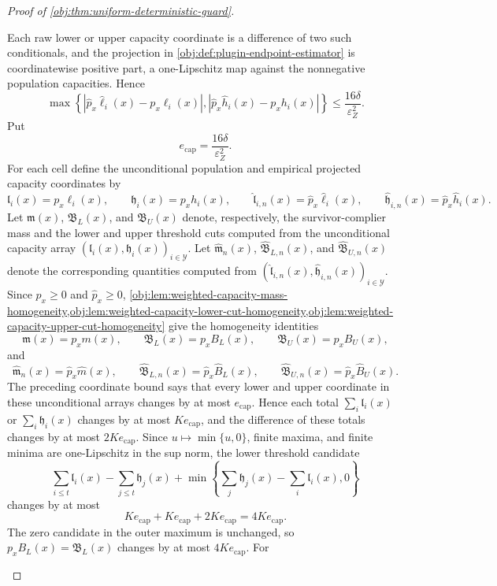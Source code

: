 \documentclass[11pt]{article}
\begin{document}
\begin{proof}[Proof of \cref{obj:thm:uniform-deterministic-guard}]
\begin{enumerate}
Each raw lower or upper capacity coordinate is a difference of two such
conditionals, and the projection in \cref{obj:def:plugin-endpoint-estimator} is
coordinatewise positive part, a one-Lipschitz map against the nonnegative
population capacities.  Hence
\[
\max\left\{
\left|\widehat p_x\widehat\ell_i(x)-p_x\ell_i(x)\right|,
\left|\widehat p_x\widehat h_i(x)-p_xh_i(x)\right|
\right\}
\le
\frac{16\delta}{\varepsilon_Z^2}.
\]
Put
\[
e_{\mathrm{cap}}=\frac{16\delta}{\varepsilon_Z^2}.
\]
For each cell define the unconditional population and empirical projected
capacity coordinates by
\[
\mathfrak l_i(x)=p_x\ell_i(x),
\qquad
\mathfrak h_i(x)=p_xh_i(x),
\qquad
\widehat{\mathfrak l}_{i,n}(x)=\widehat p_x\widehat\ell_i(x),
\qquad
\widehat{\mathfrak h}_{i,n}(x)=\widehat p_x\widehat h_i(x).
\]
Let \(\mathfrak m(x)\), \(\mathfrak B_L(x)\), and \(\mathfrak B_U(x)\) denote,
respectively, the survivor-complier mass and the lower and upper threshold cuts
computed from the unconditional capacity array
\((\mathfrak l_i(x),\mathfrak h_i(x))_{i\in\mathcal Y}\).  Let
\(\widehat{\mathfrak m}_n(x)\), \(\widehat{\mathfrak B}_{L,n}(x)\), and
\(\widehat{\mathfrak B}_{U,n}(x)\) denote the corresponding quantities computed
from
\((\widehat{\mathfrak l}_{i,n}(x),\widehat{\mathfrak h}_{i,n}(x))_{i\in\mathcal Y}\).
Since \(p_x\ge0\) and \(\widehat p_x\ge0\),
\cref{obj:lem:weighted-capacity-mass-homogeneity,obj:lem:weighted-capacity-lower-cut-homogeneity,obj:lem:weighted-capacity-upper-cut-homogeneity}
give the homogeneity identities
\[
\mathfrak m(x)=p_xm(x),
\qquad
\mathfrak B_L(x)=p_xB_L(x),
\qquad
\mathfrak B_U(x)=p_xB_U(x),
\]
and
\[
\widehat{\mathfrak m}_n(x)=\widehat p_x\widehat m(x),
\qquad
\widehat{\mathfrak B}_{L,n}(x)=\widehat p_x\widehat B_L(x),
\qquad
\widehat{\mathfrak B}_{U,n}(x)=\widehat p_x\widehat B_U(x).
\]
The preceding coordinate bound says that every lower and upper coordinate in
these unconditional arrays changes by at most \(e_{\mathrm{cap}}\).  Hence each
total \(\sum_i\mathfrak l_i(x)\) or \(\sum_i\mathfrak h_i(x)\) changes by at most
\(Ke_{\mathrm{cap}}\), and the difference of these totals changes by at most
\(2Ke_{\mathrm{cap}}\).  Since \(u\mapsto \min\{u,0\}\), finite maxima, and
finite minima are one-Lipschitz in the sup norm, the lower threshold candidate
\[
\sum_{i\le t}\mathfrak l_i(x)-\sum_{j\le t}\mathfrak h_j(x)
+
\min\left\{\sum_j\mathfrak h_j(x)-\sum_i\mathfrak l_i(x),0\right\}
\]
changes by at most
\[
Ke_{\mathrm{cap}}+Ke_{\mathrm{cap}}+2Ke_{\mathrm{cap}}
=
4Ke_{\mathrm{cap}}.
\]
The zero candidate in the outer maximum is unchanged, so
\(p_xB_L(x)=\mathfrak B_L(x)\) changes by at most \(4Ke_{\mathrm{cap}}\).  For

\end{enumerate}
\end{proof}
\end{document}
